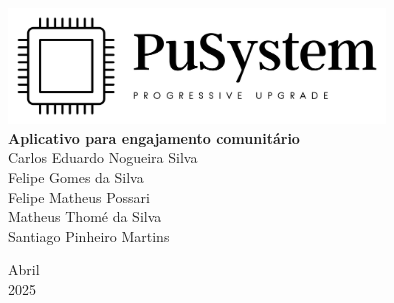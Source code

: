 \documentclass[a4paper, 12pt]{article}
\begin{document}

\begin{titlepage}
	\begin{center}
	

        \includegraphics[width=10cm]{Logo Transparente Preto.png} \\ 
		\vspace{115pt}
        \textbf{\Huge{Aplicativo para engajamento comunitário}}\\
        
		\vspace{115pt}
        Carlos Eduardo Nogueira Silva \\
        Felipe Gomes da Silva \\
        Felipe Matheus Possari \\
        Matheus Thomé da Silva\\ 
        Santiago Pinheiro Martins \\
	\end{center}
	
	
	\vspace{1cm}
	\begin{center}
		\vspace{\fill}
		 Abril \\
		 2025
			\end{center}
\end{titlepage}

\newpage
\tableofcontents
\thispagestyle{empty}

\newpage
\pagestyle{fancy}

\fancyhead[L]{\nouppercase{\leftmark}}  %
\fancyfoot[R]{\thepage}  %
\fancyfoot[C]{}  %
\setlength\headheight{26pt}  %
\end{document}
